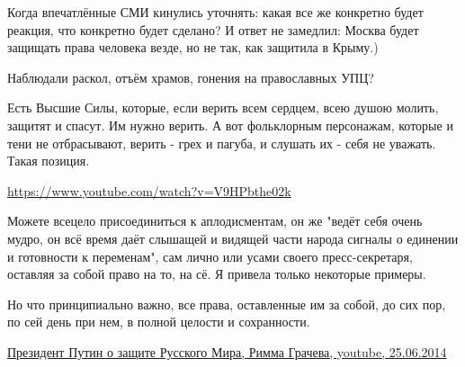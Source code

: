 \begin{itemize}
\begin{itemize}
Когда впечатлённые СМИ кинулись уточнять: какая все же конкретно будет реакция,
что конкретно будет сделано? И ответ не замедлил: Москва будет защищать права
человека везде, но не так, как защитила в Крыму.)

Наблюдали раскол, отъём храмов, гонения на православных УПЦ?

Есть Высшие Силы, которые, если верить всем сердцем, всею душою молить, защитят
и спасут. Им нужно верить. А вот фольклорным персонажам, которые и тени не
отбрасывают, верить - грех и пагуба, и слушать их - себя не уважать. Такая
позиция.

\url{https://www.youtube.com/watch?v=V9HPbthe02k}

Можете всецело присоединиться к аплодисментам, он же "ведёт себя очень мудро,
он всё время даёт слышащей и видящей части народа сигналы о единении и
готовности к переменам", сам лично или усами своего пресс-секретаря, оставляя
за собой право на то, на сё. Я привела только некоторые примеры.

Но что принципиально важно, все права, оставленные им за собой, до сих пор, по
сей день при нем, в полной целости и сохранности.

\href{https://www.youtube.com/watch?v=Znxhc5IWvfM}{%
Президент Путин о защите Русского Мира, Римма Грачева, youtube, 25.06.2014%
}

\end{itemize}

\end{itemize}

